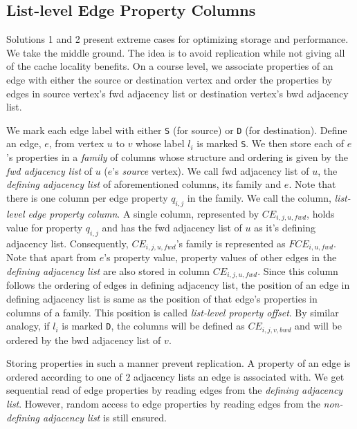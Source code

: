 \subsection{List-level Edge Property Columns}

Solutions 1 and 2 present extreme cases for optimizing storage and performance. We take the middle ground. The idea is to avoid replication while not giving all of the cache locality benefits. On a course level, we associate properties of an edge with either the source or destination vertex and order the properties by edges in source vertex's \gls{fwd} adjacency list or destination vertex's \gls{bwd} adjacency list.

We mark each edge label with either \texttt{S} (for source) or \texttt{D} (for destination). Define an edge, $e$, from vertex $u$ to $v$ whose label $l_i$ is marked \texttt{S}. We then store each of $e$'s properties in a \emph{family} of columns whose structure and ordering is given by the \emph{\gls{fwd} adjacency list} of $u$ ($e$'s \emph{source} vertex). We call \gls{fwd} adjacency list of $u$, the \emph{defining adjacency list} of aforementioned columns, its family and $e$. Note that there is one column per edge property $q_{i,j}$ in the family. We call the column, \emph{list-level edge property column}. A single column, represented by $CE_{i,j,u,fwd}$, holds value for property $q_{i,j}$ and has the \gls{fwd} adjacency list of $u$ as it's defining adjacency list. Consequently, $CE_{i,j,u,fwd}$'s family is represented as $FCE_{i,u,fwd}$. Note that apart from $e$'s property value, property values of other edges in the \emph{defining adjacency list} are also stored in column $CE_{i,j,u,fwd}$. Since this column follows the ordering of edges in defining adjacency list, the position of an edge in defining adjacency list is same as the position of that edge's properties in columns of a family. This position is called \emph{list-level property offset}. By similar analogy, if $l_i$ is marked \texttt{D}, the columns will be defined as $CE_{i,j,v,bwd}$ and will be ordered by the \gls{bwd} adjacency list of $v$.

Storing properties in such a manner prevent replication. A property of an edge is ordered according to one of 2 adjacency lists an edge is associated with. We get sequential read of edge properties by reading edges from the \emph{defining adjacency list}. However, random access to edge properties by reading edges from the \emph{non-defining adjacency list} is still ensured.

